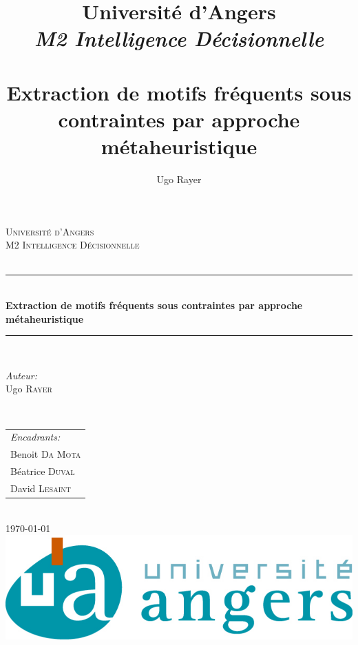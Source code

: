 \documentclass[a4paper,10pt]{report}
\title{Université d'Angers \\  \emph{M2 Intelligence Décisionnelle \\} \hrulefill \\ \textbf{Extraction de motifs fréquents sous contraintes par approche métaheuristique} \\ \hrulefill}
\author{Ugo Rayer}
\begin{document}
    \begin{titlepage}

\newcommand{\HRule}{\rule{\linewidth}{0.5mm}}

\center 

\textsc{\LARGE Université d'Angers}\\[1.5cm] 
\textsc{\Large M2 Intelligence Décisionnelle}\\ [0.5cm] 
\textsc{\large }\\[0.5cm] 


\HRule \\[0.4cm]
{ \huge \bfseries Extraction de motifs fréquents sous contraintes par approche métaheuristique}\\[0.4cm] 
\HRule \\[1.5cm]
 

\begin{minipage}{0.4\textwidth}
\begin{flushleft} \large
\emph{Auteur:}\\
Ugo \textsc{Rayer} 
\end{flushleft}
\end{minipage}
~
\begin{minipage}{0.4\textwidth}
\begin{flushright} \large
\hfill
\begin{tabular}{@{}l@{}}
\emph{Encadrants:}\\
Benoit \textsc{Da Mota} \\
Béatrice \textsc{Duval} \\
David \textsc{Lesaint} 
\end{tabular}
\end{flushright}
\end{minipage}\\[4cm]



{\large \today}\\[3cm] 



\includegraphics{./img/ua.jpg}\\[1cm]

\vfill 

\end{titlepage}
\end{document}
